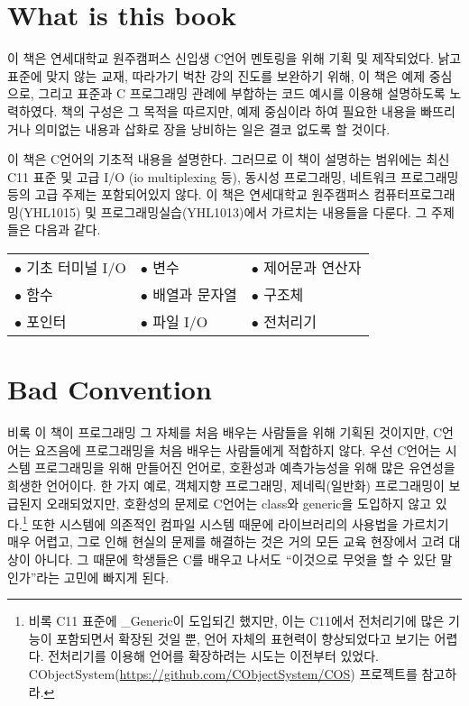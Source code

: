 \documentclass[../main.tex]{subfiles}
\begin{document}
\section*{What is this book}
이 책은 연세대학교 원주캠퍼스 신입생 C언어 멘토링을 위해 기획 및
제작되었다. 낡고 표준에 맞지 않는 교재, 따라가기 벅찬 강의 진도를
보완하기 위해, 이 책은 예제 중심으로, 그리고 표준과 C 프로그래밍 관례에
부합하는 코드 예시를 이용해 설명하도록 노력하였다. 책의 구성은 그
목적을 따르지만, 예제 중심이라 하여 필요한 내용을 빠뜨리거나 의미없는
내용과 삽화로 장을 낭비하는 일은 결코 없도록 할 것이다.

이 책은 C언어의 기초적 내용을 설명한다. 그러므로 이 책이 설명하는
범위에는 최신 C11 표준 및 고급 I/O (io multiplexing 등), 동시성
프로그래밍, 네트워크 프로그래밍 등의 고급 주제는 포함되어있지 않다. 이
책은 연세대학교 원주캠퍼스 컴퓨터프로그래밍(YHL1015) 및
프로그래밍실습(YHL1013)에서 가르치는 내용들을 다룬다. 그 주제들은
다음과 같다.

\begin{tabular}{ l l l }
  $\bullet$ 기초 터미널 I/O & $\bullet$ 변수 & $\bullet$ 제어문과 연산자\\
  $\bullet$ 함수 & $\bullet$ 배열과 문자열 & $\bullet$ 구조체\\
  $\bullet$ 포인터 & $\bullet$ 파일 I/O & $\bullet$ 전처리기\\
\end{tabular}

\section*{Bad Convention}
비록 이 책이 프로그래밍 그 자체를 처음 배우는 사람들을 위해 기획된
것이지만, C언어는 요즈음에 프로그래밍을 처음 배우는 사람들에게 적합하지
않다. 우선 C언어는 시스템 프로그래밍을 위해 만들어진 언어로, 호환성과
예측가능성을 위해 많은 유연성을 희생한 언어이다. 한 가지 예로, 객체지향
프로그래밍, 제네릭(일반화) 프로그래밍이 보급된지 오래되었지만, 호환성의
문제로 C언어는 class와 generic을 도입하지 않고 있다.\footnote{ 비록
  C11 표준에 \_Generic이 도입되긴 했지만, 이는 C11에서 전처리기에 많은
  기능이 포함되면서 확장된 것일 뿐, 언어 자체의 표현력이 향상되었다고
  보기는 어렵다. 전처리기를 이용해 언어를 확장하려는 시도는 이전부터
  있었다. CObjectSystem(\url{https://github.com/CObjectSystem/COS})
  프로젝트를 참고하라.} 또한 시스템에 의존적인 컴파일 시스템 때문에
라이브러리의 사용법을 가르치기 매우 어렵고, 그로 인해 현실의 문제를
해결하는 것은 거의 모든 교육 현장에서 고려 대상이 아니다. 그 때문에
학생들은 C를 배우고 나서도 ``이것으로 무엇을 할 수 있단 말인가''라는
고민에 빠지게 된다.
\end{document}
